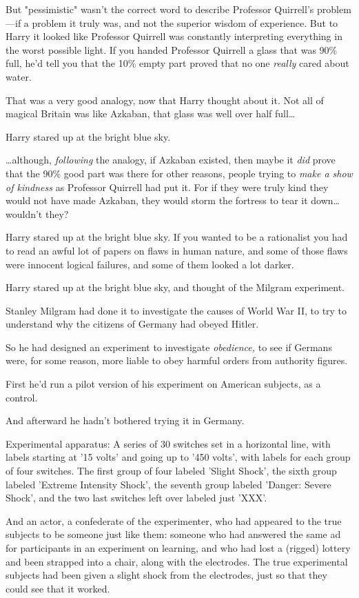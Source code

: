 But "pessimistic" wasn't the correct word to describe Professor Quirrell's 
problem---if a problem it truly was, and not the superior wisdom of experience. 
But to Harry it looked like Professor Quirrell was constantly interpreting 
everything in the worst possible light. If you handed Professor Quirrell a 
glass that was 90\% full, he'd tell you that the 10\% empty part proved that no 
one \emph{really} cared about water.

That was a very good analogy, now that Harry thought about it. Not all of 
magical Britain was like Azkaban, that glass was well over half full{\ldots}

Harry stared up at the bright blue sky.

{\ldots}although, \emph{following} the analogy, if Azkaban existed, then maybe 
it \emph{did} prove that the 90\% good part was there for other reasons, people 
trying to \emph{make a show of kindness} as Professor Quirrell had put it. For 
if they were truly kind they would not have made Azkaban, they would storm the 
fortress to tear it down{\ldots} wouldn't they?

Harry stared up at the bright blue sky. If you wanted to be a rationalist you 
had to read an awful lot of papers on flaws in human nature, and some of those 
flaws were innocent logical failures, and some of them looked a lot darker.

Harry stared up at the bright blue sky, and thought of the Milgram experiment.

Stanley Milgram had done it to investigate the causes of World War II, to try 
to understand why the citizens of Germany had obeyed Hitler.

So he had designed an experiment to investigate \emph{obedience,} to see if 
Germans were, for some reason, more liable to obey harmful orders from 
authority figures.

First he'd run a pilot version of his experiment on American subjects, as a 
control.

And afterward he hadn't bothered trying it in Germany.

Experimental apparatus: A series of 30 switches set in a horizontal line, with 
labels starting at '15 volts' and going up to '450 volts', with labels for each 
group of four switches. The first group of four labeled 'Slight Shock', the 
sixth group labeled 'Extreme Intensity Shock', the seventh group labeled 
'Danger: Severe Shock', and the two last switches left over labeled just 'XXX'.

And an actor, a confederate of the experimenter, who had appeared to the true 
subjects to be someone just like them: someone who had answered the same ad for 
participants in an experiment on learning, and who had lost a (rigged) lottery 
and been strapped into a chair, along with the electrodes. The true 
experimental subjects had been given a slight shock from the electrodes, just 
so that they could see that it worked.

